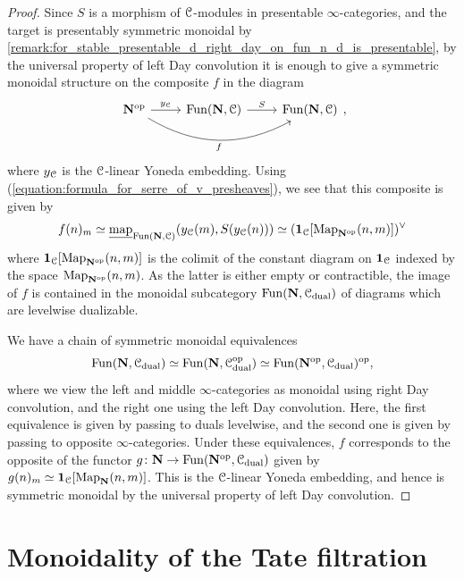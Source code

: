 \documentclass[oneside,a4paper]{amsart}
\begin{document}
\begin{proof}
Since $S$ is a morphism of $\EuScript{C}$-modules in presentable $\infty$-categories, and the target is presentably symmetric monoidal by \cref{remark:for_stable_presentable_d_right_day_on_fun_n_d_is_presentable}, by the universal property of left Day convolution it is enough to give a symmetric monoidal structure on the composite $f$ in the diagram
\[
\begin{tikzcd}
	{\mathbf{N}^{\op}} & {\Fun(\mathbf{N}, \ccat)} & {\Fun(\mathbf{N}, \ccat)}
	\arrow["{y_{\ccat}}", from=1-1, to=1-2]
	\arrow["f"', bend right=30, from=1-1, to=1-3]
	\arrow["S", from=1-2, to=1-3]
\end{tikzcd},
\]
where $y_{\EuScript{C}}$ is the $\EuScript{C}$-linear Yoneda embedding. Using (\ref{equation:formula_for_serre_of_v_presheaves}), we see that this composite is given by 
\[
f(n)_{m} \simeq \underline{\textnormal{map}}_{\mathrm{Fun}(\mathbf{N},\EuScript{C})}(y_{\EuScript{C}}(m), S(y_{\EuScript{C}}(n))) \simeq (\mathbf{1}_{\EuScript{C}}[\mathrm{Map}_{\mathbf{N}^{\mathrm{op}}}(n, m)])^{\vee}
\]
where $\mathbf{1}_{\EuScript{C}}[\mathrm{Map}_{\mathbf{N}^{\mathrm{op}}}(n, m)]$ is the colimit of the constant diagram on $\mathbf{1}_{\EuScript{C}}$ indexed by the space $\mathrm{Map}_{\mathbf{N}^{\mathrm{op}}}(n, m)$. As the latter is either empty or contractible, the image of $f$ is contained in the monoidal subcategory $\mathrm{Fun}(\mathbf{N}, \EuScript{C}_{\mathrm{dual}})$ of diagrams which are levelwise dualizable. 

We have a chain of symmetric monoidal equivalences 
\[
\mathrm{Fun}(\mathbf{N}, \EuScript{C}_{\mathrm{dual}})  \simeq \mathrm{Fun}(\mathbf{N}, \EuScript{C}_{\mathrm{dual}}^{\mathrm{op}}) \simeq \mathrm{Fun}(\mathbf{N}^{\mathrm{op}}, \EuScript{C}_{\mathrm{dual}})^{\mathrm{op}}, 
\]
where we view the left and middle $\infty$-categories as monoidal using right Day convolution, and the right one using the left Day convolution. Here, the first equivalence is given by passing to duals levelwise, and the second one is given by passing to opposite $\infty$-categories. Under these equivalences, $f$ corresponds to the opposite of the functor $g \colon \mathbf{N} \rightarrow \mathrm{Fun}(\mathbf{N}^{\mathrm{op}}, \EuScript{C}_{\mathrm{dual}})$ given by $g(n)_{m} \simeq \mathbf{1}_{\EuScript{C}}[\mathrm{Map}_{\mathbf{N}}(n, m)]$. This is the $\EuScript{C}$-linear Yoneda embedding, and hence is symmetric monoidal by the universal property of left Day convolution. 
\end{proof}

\section{Monoidality of the Tate filtration} 
\label{section:tate_filtration}
\end{document}
